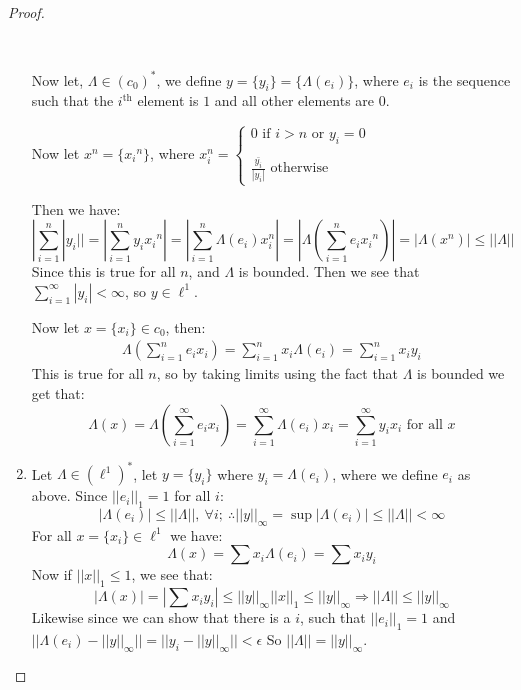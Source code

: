 \documentclass{article}
\theoremstyle{definition}
\theoremstyle{remark}
\theoremstyle{definition}
\begin{document}
\begin{proof}
\begin{enumerate}[label = (\alph*)]
    \

    Now let, $\Lambda\in {(c_0)}^\ast$, we define $y=\{y_i\} = \{\Lambda(e_i)\}$, where $e_i$ is the sequence such that the $i^\text{th}$ element is $1$ and all other elements are $0$.

    Now let $x^n = \{{x_i}^n\}$, where $x_i^n = \begin{cases}0 \text{ if }i> n\text{ or }y_i=0\\ \\ \frac{\bar{y_i}}{|y_i|}\text{ otherwise}\end{cases}$
    
    Then we have:\begin{equation}
        |\sum_{i=1}^n |y_i|| = |\sum_{i=1}^n {y_i}{x_i}^n| = |\sum_{i=1}^n \Lambda(e_i)x_i^n| = |\Lambda(\sum_{i=1}^n {e_i}{x_i}^n )| = |\Lambda(x^n)|\leq ||\Lambda||
    \end{equation}
Since this is true for all $n$, and $\Lambda$ is bounded. Then we see that $\sum_{i=1}^\infty |y_i| <\infty$, so $y\in \ell^1$.

Now let $x = \{x_i\}\in c_0$, then: \begin{align*}
    \Lambda(\sum_{i=1}^n {e_i}{x_i}) = \sum_{i=1}^n x_i\Lambda(e_i) =  \sum_{i=1}^n{x_i}{y_i}
\end{align*} 
This is true for all $n$, so by taking limits using the fact that $\Lambda$ is bounded we get that:\begin{equation}
    \Lambda(x) = \Lambda(\sum_{i=1}^\infty {e_i}{x_i}) = \sum_{i=1}^\infty \Lambda({e_i}){x_i} = \sum_{i=1}^\infty {y_i}{x_i} \text{ for all }x
\end{equation}
\item Let $\Lambda\in {(\ell^1)}^\ast$, let $y = \{y_i\}$ where $y_i = \Lambda(e_i)$, where we define $e_i$ as above. Since $||e_i||_1 = 1$ for all $i$:\begin{equation}
    |\Lambda(e_i)| \leq ||\Lambda||, \ \forall i; \ \therefore ||y||_\infty = \sup |\Lambda(e_i)| \leq ||\Lambda||<\infty 
\end{equation}
For all $x=\{x_i\}\in \ell^1$ we have:\begin{equation}
    \Lambda(x) = \sum x_i\Lambda(e_i) = \sum {x_i}{y_i}
\end{equation}
Now if $||x||_1\leq 1$, we see that:\begin{equation}
    |\Lambda(x)| = |\sum x_i y_i|\leq ||y||_\infty ||x||_1\leq ||y||_\infty \Rightarrow ||\Lambda||\leq ||y||_\infty 
\end{equation}
Likewise since we can show that there is a $i$, such that $||e_i||_1 = 1$ and $||\Lambda(e_i) - ||y||_\infty|| = ||y_i-||y||_\infty||<\epsilon$
So $||\Lambda|| = ||y||_\infty$.


\end{enumerate}
\end{proof}
\end{document}
